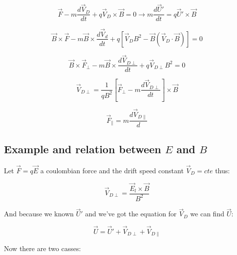 \documentclass[spanish,notitlepage,letterpaper,11pt]{article} %
\numberwithin{equation}{subsection}
\begin{document}
            \begin{equation*}
                \Vec{F} - m\frac{d\Vec{V}_D}{dt} + q\Vec{V}_D\times\Vec{B} = 0 \rightarrow m\frac{d\Vec{U}'}{dt} = q\Vec{U}'\times\Vec{B}
            \end{equation*}

            \begin{equation}
                \Vec{B}\times\Vec{F} - m\Vec{B}\times\frac{d\Vec{V}_d}{dt} + q[\Vec{V}_DB^2 - \Vec{B}(\Vec{V}_D\cdot\Vec{B})]=0
            \end{equation}

            \begin{equation*}
                \Vec{B}\times\Vec{F}_{\perp} - m\Vec{B}\times\frac{d\Vec{V}_{D\perp}}{dt} + q \Vec{V}_{D\perp}B^2 = 0
            \end{equation*}

            \begin{equation}
                \Vec{V}_{D\perp} = \frac{1}{qB^2}\left[\Vec{F}_{\perp} - m\frac{d\Vec{V}_{D\perp}}{dt}\right]\times\Vec{B}
            \end{equation}

            \begin{equation}
                \Vec{F}_{\parallel} = m\frac{d\Vec{V}_{D\parallel}}{d}
            \end{equation}

        \subsection{Example and relation between $E$ and $B$}

            Let $\Vec{F} = q\Vec{E}$ a coulombian force and the drift speed constant $\Vec{V}_D = cte$ thus:

            \begin{equation}\label{eq:VDperp}
                \Vec{V}_{D\perp} = \frac{\Vec{E}_l \times\Vec{B}}{B^2}
            \end{equation}

            And because we known $\Vec{U}'$ and we've got the equation for $\Vec{V}_D$ we can find $\Vec{U}$:

            \begin{equation}
                \Vec{U} = \Vec{U}' + \Vec{V}_{D\perp} + \Vec{V}_{D\parallel}
            \end{equation}

            Now there are two casses:
\end{document}

